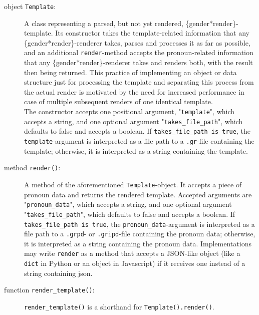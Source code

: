 \documentclass{article}
\begin{document}
    \begin{description}
        \item[object \texttt{Template}:] A class representing a parsed, but not yet rendered, \{gender*render\}-template.
                                         Its constructor takes the template-related information that any \{gender*render\}-renderer takes, parses and processes it as far as possible, and an additional \texttt{render}-method accepts the pronoun-related information that any \{gender*render\}-renderer takes and renders both, with the result then being returned.
                                         This practice of implementing an object or data structure just for processing the template and separating this process from the actual render is motivated by the need for increased performance in case of multiple subsequent renders of one identical template.\\
                                         The constructor accepts one positional argument, "\texttt{template}", which accepts a string, and one optional argument "\texttt{takes\_file\_path}", which defaults to false and accepts a boolean.
                                         If \texttt{takes\_file\_path is true}, the \texttt{template}-argument is interpreted as a file path to a \texttt{.gr}-file containing the template;
                                         otherwise, it is interpreted as a string containing the template.
        \item[method \texttt{render()}:] A method of the aforementioned \texttt{Template}-object.
                                        It accepts a piece of pronoun data and returns the rendered template.
                                        Accepted arguments are "\texttt{pronoun\_data}", which accepts a string, and one optional argument "\texttt{takes\_file\_path}", which defaults to false and accepts a boolean.
                                        If \texttt{takes\_file\_path is true}, the \texttt{pronoun\_data}-argument is interpreted as a file path to a \texttt{.grpd}- or \texttt{.gripd}-file containing the pronoun data;
                                        otherwise, it is interpreted as a string containing the pronoun data.
                                        Implementations may write \texttt{render} as a method that accepts a JSON-like object (like a \texttt{dict} in Python or an object in Javascript) if it receives one instead of a string containing json.
        \item[function \texttt{render\_template()}:] \texttt{render\_template()} is a shorthand for \texttt{Template().render()}.

\end{description}
\end{document}
